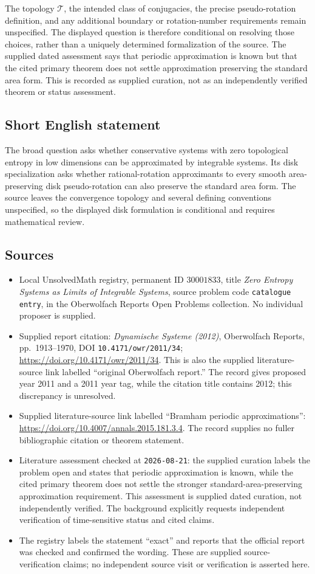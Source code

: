 \documentclass[11pt]{article}
\begin{document}
The topology \(\mathcal T\), the intended class of conjugacies, the precise pseudo-rotation definition, and any additional boundary or rotation-number requirements remain unspecified. The displayed question is therefore conditional on resolving those choices, rather than a uniquely determined formalization of the source. The supplied dated assessment says that periodic approximation is known but that the cited primary theorem does not settle approximation preserving the standard area form. This is recorded as supplied curation, not as an independently verified theorem or status assessment.
\subsection{Short English statement}
The broad question asks whether conservative systems with zero topological entropy in low dimensions can be approximated by integrable systems. Its disk specialization asks whether rational-rotation approximants to every smooth area-preserving disk pseudo-rotation can also preserve the standard area form. The source leaves the convergence topology and several defining conventions unspecified, so the displayed disk formulation is conditional and requires mathematical review.
\subsection{Sources}
\begin{itemize}
\item Local UnsolvedMath registry, permanent ID \(30001833\), title \emph{Zero Entropy Systems as Limits of Integrable Systems}, source problem code \texttt{catalogue entry}, in the Oberwolfach Reports Open Problems collection. No individual proposer is supplied.
\item Supplied report citation: \emph{Dynamische Systeme (2012)}, Oberwolfach Reports, pp.~1913--1970, DOI \texttt{10.4171/owr/2011/34}; \url{https://doi.org/10.4171/owr/2011/34}. This is also the supplied literature-source link labelled ``original Oberwolfach report.'' The record gives proposed year 2011 and a 2011 year tag, while the citation title contains 2012; this discrepancy is unresolved.
\item Supplied literature-source link labelled ``Bramham periodic approximations'': \url{https://doi.org/10.4007/annals.2015.181.3.4}. The record supplies no fuller bibliographic citation or theorem statement.
\item Literature assessment checked at \texttt{2026-08-21}: the supplied curation labels the problem open and states that periodic approximation is known, while the cited primary theorem does not settle the stronger standard-area-preserving approximation requirement. This assessment is supplied dated curation, not independently verified. The background explicitly requests independent verification of time-sensitive status and cited claims.
\item The registry labels the statement ``exact'' and reports that the official report was checked and confirmed the wording. These are supplied source-verification claims; no independent source visit or verification is asserted here.
\end{itemize}
\end{document}
